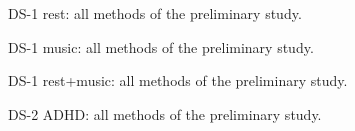 \begin{table}[H]\caption{DS-1 rest: all methods of the preliminary study.}\label{tab:models_rest}
\centering{}\end{table}
\begin{table}[H]\caption{DS-1 music: all methods of the preliminary study.}\label{tab:models_music}
\centering{}\end{table}
\begin{table}[H]\caption{DS-1 rest+music: all methods of the preliminary study.}\label{tab:models_rm}
\centering{}\end{table}
\begin{table}[H]\caption{DS-2 ADHD: all methods of the preliminary study. \dstwonote}\label{tab:models_ds2}
\centering{}\end{table}
